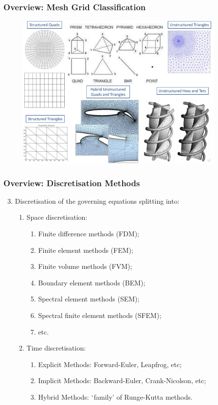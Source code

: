 \documentclass[10pt,compress]{beamer}
\begin{document}
\begin{frame}
 \frametitle{Overview: Mesh Grid Classification}

   \begin{figure}%
    \begin{center}
     \includegraphics[width=12.cm, height=7.8cm, clip]{./Figs/MeshGrid_Examples.pdf}\label{xx}
    \end{center}
   \end{figure}    

\end{frame}

\begin{frame}
 \frametitle{Overview: Discretisation Methods} 
\begin{enumerate}
  \setcounter{enumi}{2}
  \item <1-> Discretisation of the governing equations splitting into:
    \begin{enumerate}
      \item <2-> Space discretisation:
        \begin{enumerate}
          \item <4-> Finite difference methods (FDM); 
          \item <5-> Finite element methods (FEM); 
          \item <6-> Finite volume methods (FVM); 
          \item <7-> Boundary element methods (BEM); 
          \item <8-> Spectral element methods (SEM); 
          \item <9-> Spectral finite element methods (SFEM); 
          \item <10-> etc. 
        \end{enumerate}
      \item <3-> Time discretisation:
        \begin{enumerate}
          \item <11-> Explicit Methods: Forward-Euler, Leapfrog, etc;
          \item <12-> Implicit Methods: Backward-Euler, Crank-Nicolson, etc;
          \item <13-> Hybrid Methods: $\lq$family' of Runge-Kutta methods.
        \end{enumerate}
    \end{enumerate}
\end{enumerate}
\end{frame}
\end{document}
